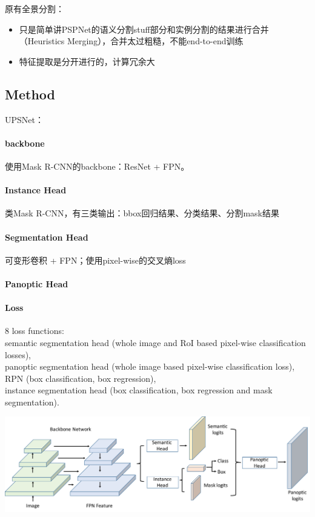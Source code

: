 \documentclass[UTF8, a4paper]{ctexart}
\begin{document}
原有全景分割：
\begin{itemize}
    \item 只是简单讲PSPNet的语义分割stuff部分和实例分割的结果进行合并（Heuristics Merging），合并太过粗糙，不能end-to-end训练
    \item 特征提取是分开进行的，计算冗余大
\end{itemize}

\subsection{Method} %

UPSNet：
\paragraph{backbone} 使用Mask R-CNN\cite{Maskrcnn_He_2017_ICCV}的backbone：ResNet\cite{ResNet_He_2016_CVPR} + FPN\cite{FPN_Lin_2017_CVPR}。
\paragraph{Instance Head} 类Mask R-CNN，有三类输出：bbox回归结果、分类结果、分割mask结果
\paragraph{Segmentation Head} 可变形卷积\cite{Deformable_Conv_Dai_2017_ICCV} + FPN；使用pixel-wise的交叉熵loss
\paragraph{Panoptic Head}
\paragraph{Loss} 8 loss functions: \\
semantic segmentation head (whole image and RoI based pixel-wise classification losses),\\ 
panoptic segmentation head (whole image based pixel-wise classification loss), \\
RPN (box classification, box regression), \\
instance segmentation head (box classification, box regression and mask segmentation).

{\includegraphics[width=0.95\linewidth]{UPSNet-network}}
\end{document}
